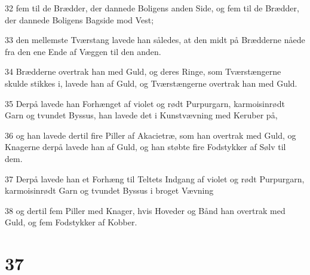\par 32 fem til de Brædder, der dannede Boligens anden Side, og fem til de Brædder, der dannede Boligens Bagside mod Vest;
\par 33 den mellemste Tværstang lavede han således, at den midt på Brædderne nåede fra den ene Ende af Væggen til den anden.
\par 34 Brædderne overtrak han med Guld, og deres Ringe, som Tværstængerne skulde stikkes i, lavede han af Guld, og Tværstængerne overtrak han med Guld.
\par 35 Derpå lavede han Forhænget af violet og rødt Purpurgarn, karmoisinrødt Garn og tvundet Byssus, han lavede det i Kunstvævning med Keruber på,
\par 36 og han lavede dertil fire Piller af Akacietræ, som han overtrak med Guld, og Knagerne derpå lavede han af Guld, og han støbte fire Fodstykker af Sølv til dem.
\par 37 Derpå lavede han et Forhæng til Teltets Indgang af violet og rødt Purpurgarn, karmoisinrødt Garn og tvundet Byssus i broget Vævning
\par 38 og dertil fem Piller med Knager, hvis Hoveder og Bånd han overtrak med Guld, og fem Fodstykker af Kobber.

\chapter{37}

